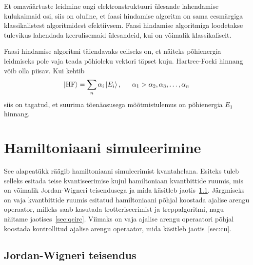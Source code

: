 \documentclass[12pt]{report}
\def\ket#1{\left|#1\right>}
\begin{document}
Et omaväärtuste leidmine ongi elektronstruktuuri ülesande lahendamise kulukaimaid osi, siis on oluline, et faasi hindamise algoritm on sama eesmärgiga klassikalistest algoritmidest efektiivsem.
Faasi hindamise algoritmiga loodetakse tulevikus lahendada keerulisemaid ülesandeid, kui on võimalik klassikaliselt.

Faasi hindamise algoritmi täiendavaks eeliseks on, et näiteks põhienergia leidmiseks pole vaja teada põhioleku vektori täpset kuju.
Hartree-Focki hinnang võib olla piisav.
Kui kehtib
\begin{align}
    \ket{\text{HF}} = \sum_n \alpha_i \ket{E_i} \rlap{,}
    \qquad \alpha_1 > \alpha_2, \alpha_3, \ldots, \alpha_n
\end{align}
siis on tagatud, et suurima tõenäosusega mõõtmistulemus on põhienergia \(E_1\) hinnang.

\section{Hamiltoniaani simuleerimine}\label{sec:hamsim}

See alapeatükk räägib hamiltoniaani simuleerimist kvantahelana.
Esiteks tuleb selleks esitada teise kvantiseerimise kujul hamiltoniaan kvantbittide ruumis, mis on võimalik Jordan-Wigneri teisendusega ja mida käsitleb jaotis~\ref{sec:jw}.
Järgmiseks on vaja kvantbittide ruumis esitatud hamiltoniaani põhjal koostada ajalise arengu operaator, milleks saab kasutada trotteriseerimist ja treppalgoritmi, nagu näitame jaotises~\ref{sec:qcirc}.
Viimaks on vaja ajalise arengu operaatori põhjal koostada kontrollitud ajalise arengu operaator, mida käsitleb jaotis~\ref{sec:cu}.

\subsection{Jordan-Wigneri teisendus}\label{sec:jw}
\end{document}
